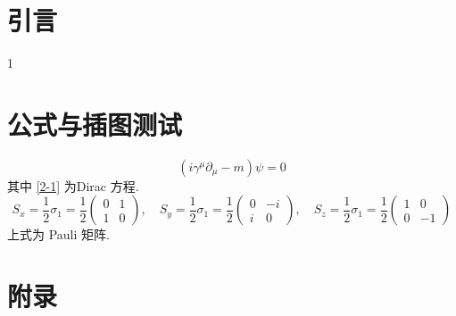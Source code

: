 \documentclass
  [
    math-font    = STIX Two Math, agreed,
    CJKmain-font = { {Songti SC}[AutoFakeBold = 2.5, AutoFakeSlant] },
    CJKsans-font = { {STHeiti}[AutoFakeBold = 2] }
  ] {hduthesis}
\begin{document}
\maketitle
{}

\begin{abstract}[cn]
\end{abstract}

\begin{abstract}[en]
\end{abstract}

\tableofcontents

\chapter{引言}
1

\cite{whole-journal}

\zhlipsum[2]
\cite{inbook-crossref,whole-set,booklet-full,incollection-crossref,whole-collection,manual-full,mastersthesis-full}

\chapter{公式与插图测试}

\begin{equation}
  (i\gamma^\mu\partial_\mu - m)\psi = 0
  \label{2-1}
\end{equation}
其中 \eqref{2-1} 为Dirac 方程.
\[
  S_x = \frac12\sigma_1 = \frac12
  \begin{pmatrix}
    0 & 1\\
    1 & 0
  \end{pmatrix}, \quad
  S_y = \frac12\sigma_1 = \frac12
  \begin{pmatrix}
    0 & -i\\
    i & 0
  \end{pmatrix}, \quad
  S_z = \frac12\sigma_1 = \frac12
  \begin{pmatrix}
    1 & 0\\
    0 & -1
  \end{pmatrix}
\]
上式为 Pauli 矩阵.

\printbibliography

\appendix
\chapter*{附录}
\end{document}
